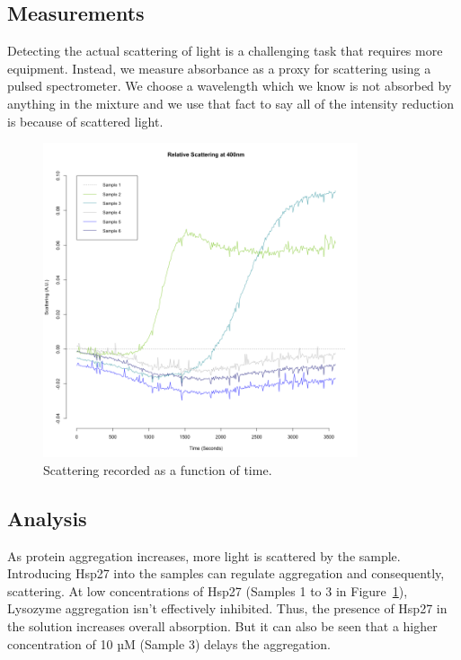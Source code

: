 \documentclass[a4paper,11pt]{article}
\begin{document}
        \subsection*{Measurements}
            Detecting the actual scattering of light is a challenging task that requires more equipment.
            Instead, we measure absorbance as a proxy for scattering using a pulsed spectrometer.
            We choose a wavelength which we know is not absorbed by anything in the mixture and 
            we use that fact to say all of the intensity reduction is because of scattered light.
            \begin{figure}[H]
                \centering
                \includegraphics[width=350px]{../resources/aggregation_main.png}
                \caption{Scattering recorded as a function of time.}\label{fig:agg_main}
            \end{figure}

        \subsection*{Analysis}
            As protein aggregation increases, more light is scattered by the sample. 
            Introducing Hsp27 into the samples can regulate aggregation and consequently, 
            scattering. At low concentrations of Hsp27 (Samples 1 to 3 in Figure~\ref{fig:agg_main}), 
            Lysozyme aggregation isn't effectively inhibited. 
            Thus, the presence of Hsp27 in the solution increases overall absorption. 
            But it can also be seen that a higher concentration of 10 µM (Sample 3) delays the aggregation. 
            
\end{document}
